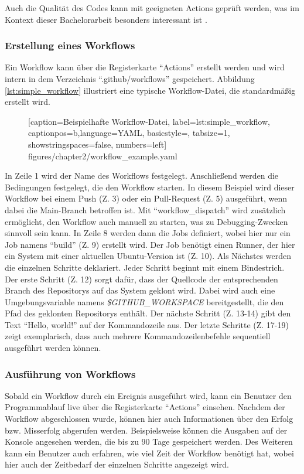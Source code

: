 Auch die Qualität des Codes kann mit geeigneten Actions geprüft werden, was im Kontext dieser Bachelorarbeit besonders interessant ist \cite[S.~1ff.]{github_action_book}.  



\subsubsection{Erstellung eines Workflows}
Ein Workflow kann über die Registerkarte \enquote{Actions} erstellt werden und wird intern in dem Verzeichnis \enquote{.github/workflows} gespeichert. Abbildung \ref{lst:simple_workflow} illustriert eine typische Workflow-Datei, die standardmäßig erstellt wird.


\begin{figure}[ht!]
	
			[caption={Beispielhafte Workflow-Datei},
			label={lst:simple_workflow},
			captionpos=b,language=YAML, basicstyle=\footnotesize, tabsize=1, showstringspaces=false,  numbers=left]
			{figures/chapter2/workflow_example.yaml}
			\end{figure}
In Zeile 1 wird der Name des Workflows festgelegt. Anschließend werden die Bedingungen festgelegt, die den Workflow starten. In diesem Beispiel wird dieser Workflow bei einem Push (Z. 3) oder ein Pull-Request (Z. 5) ausgeführt, wenn dabei die Main-Branch betroffen ist. Mit \enquote{workflow\_dispatch} wird zusätzlich ermöglicht, den Workflow auch manuell zu starten, was zu Debugging-Zwecken sinnvoll sein kann. In Zeile 8 werden dann die Jobs definiert, wobei hier nur ein Job namens \enquote{build} (Z. 9) erstellt wird. Der Job benötigt einen Runner, der hier ein System mit einer aktuellen Ubuntu-Version ist (Z. 10). Als Nächstes werden die einzelnen Schritte deklariert. Jeder Schritt beginnt mit einem Bindestrich. Der erste Schritt (Z. 12) sorgt dafür, dass der Quellcode der entsprechenden Branch des Repositorys auf das System geklont wird. Dabei wird auch eine Umgebungsvariable namens \textit{\$GITHUB\_WORKSPACE} bereitgestellt, die den Pfad des geklonten Repositorys enthält. Der nächste Schritt (Z. 13-14) gibt den Text \enquote{Hello, world!} auf der Kommandozeile aus. Der letzte Schritte (Z. 17-19) zeigt exemplarisch, dass auch mehrere Kommandozeilenbefehle sequentiell ausgeführt  werden können.

\subsubsection{Ausführung von Workflows}
Sobald ein Workflow durch ein Ereignis ausgeführt wird, kann ein Benutzer den Programmablauf live über die Registerkarte \enquote{Actions} einsehen. Nachdem der Workflow abgeschlossen wurde, können hier auch Informationen über den Erfolg bzw. Misserfolg abgerufen werden. Beispielsweise können die Ausgaben auf der Konsole angesehen werden, die bis zu 90 Tage gespeichert werden.  Des Weiteren kann ein Benutzer auch erfahren, wie viel Zeit der Workflow benötigt hat, wobei hier auch der Zeitbedarf der einzelnen Schritte angezeigt wird. 

